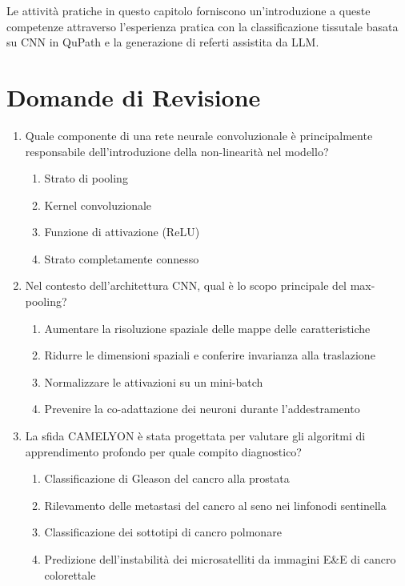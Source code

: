  Le attività pratiche in questo capitolo forniscono un'introduzione a queste competenze attraverso l'esperienza pratica con la classificazione tissutale basata su CNN in QuPath e la generazione di referti assistita da LLM.

\section{Domande di Revisione}
\label{sec:ch4_questions}

\begin{enumerate}

  \item \label{ch4:q1} Quale componente di una rete neurale convoluzionale è principalmente responsabile dell'introduzione della non-linearità nel modello?
  \begin{enumerate}[label=\Alph*.]
    \item Strato di pooling
    \item Kernel convoluzionale
    \item Funzione di attivazione (ReLU)
    \item Strato completamente connesso
  \end{enumerate}

  \item \label{ch4:q2} Nel contesto dell'architettura CNN, qual è lo scopo principale del max-pooling?
  \begin{enumerate}[label=\Alph*.]
    \item Aumentare la risoluzione spaziale delle mappe delle caratteristiche
    \item Ridurre le dimensioni spaziali e conferire invarianza alla traslazione
    \item Normalizzare le attivazioni su un mini-batch
    \item Prevenire la co-adattazione dei neuroni durante l'addestramento
  \end{enumerate}

  \item \label{ch4:q3} La sfida CAMELYON è stata progettata per valutare gli algoritmi di apprendimento profondo per quale compito diagnostico?
  \begin{enumerate}[label=\Alph*.]
    \item Classificazione di Gleason del cancro alla prostata
    \item Rilevamento delle metastasi del cancro al seno nei linfonodi sentinella
    \item Classificazione dei sottotipi di cancro polmonare
    \item Predizione dell'instabilità dei microsatelliti da immagini E\&E di cancro colorettale
  \end{enumerate}


\end{enumerate}
